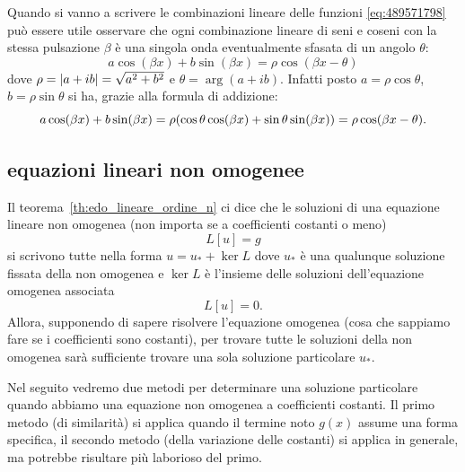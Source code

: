 % 
\begin{remark}
Quando si vanno a scrivere le combinazioni lineare delle funzioni 
\eqref{eq:489571798}
può essere utile osservare
che ogni combinazione lineare di seni e coseni
con la stessa pulsazione $\beta$ è una singola onda
eventualmente sfasata di un angolo $\theta$:
\[
  a \cos (\beta x) + b \sin (\beta x)
  =
  \rho \cos(\beta x - \theta)
\]
dove $\rho = {\left|a+ib\right|} = \sqrt{a^2+b^2}$ e $\theta=\arg(a+ib)$. Infatti
posto $a=\rho\cos \theta$, $b=\rho \sin \theta$ si ha,
grazie alla formula di addizione:
\[
   a \cos (\beta x) + b \sin (\beta x)
   = \rho{\left( \cos \theta \cos(\beta x) + \sin \theta \sin (\beta x) \right)}
   = \rho \cos(\beta x - \theta).
\]
\end{remark}

\subsection{equazioni lineari non omogenee}

Il teorema~\ref{th:edo_lineare_ordine_n}%
ci dice che le soluzioni di una 
 equazione lineare non omogenea (non importa se a coefficienti costanti o meno)
\[
  L[u]=g
\]
si scrivono tutte nella forma $u = u_* + \ker L$ dove 
$u_*$ è una qualunque soluzione fissata della non omogenea 
e $\ker L$ è l'insieme delle soluzioni dell'equazione omogenea 
associata 
\[
  L[u] =0. 
\]
Allora, supponendo di sapere risolvere l'equazione omogenea 
(cosa che sappiamo fare se i coefficienti sono costanti),
per trovare tutte le soluzioni della non omogenea sarà sufficiente 
trovare una sola soluzione particolare $u_*$.

Nel seguito vedremo due metodi per determinare una soluzione particolare 
quando abbiamo una equazione non omogenea a coefficienti costanti. 
Il primo metodo (di similarità) si applica quando il termine noto $g(x)$ assume una forma specifica,
il secondo metodo (della variazione delle costanti) si applica in generale, ma potrebbe risultare 
più laborioso del primo.

